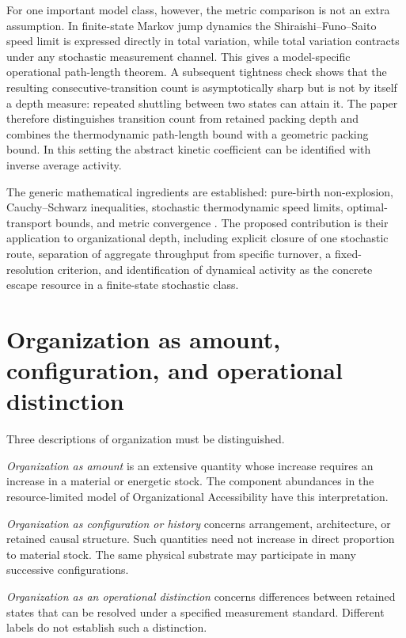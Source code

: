 \documentclass[11pt,a4paper]{article}
\theoremstyle{definition}
\numberwithin{equation}{section}
\begin{document}
For one important model class, however, the metric comparison is not an
extra assumption. In finite-state Markov jump dynamics the
Shiraishi--Funo--Saito speed limit is expressed directly in total
variation, while total variation contracts under any stochastic
measurement channel. This gives a model-specific operational path-length
theorem. A subsequent tightness check shows that the resulting
consecutive-transition count is asymptotically sharp but is not by itself a
depth measure: repeated shuttling between two states can attain it. The paper
therefore distinguishes transition count from retained packing depth and
combines the thermodynamic path-length bound with a geometric packing bound.
In this setting the abstract kinetic coefficient can be identified with
inverse average activity.

The generic mathematical ingredients are established: pure-birth
non-explosion, Cauchy--Schwarz inequalities, stochastic thermodynamic
speed limits, optimal-transport bounds, and metric convergence
\cite{Feller1971,Shiraishi2018,Aurell2011,VuSaito2023,Nagayama2025,Zhang2001}.
The proposed contribution is their application to organizational depth,
including explicit closure of one stochastic route, separation of
aggregate throughput from specific turnover, a fixed-resolution
criterion, and identification of dynamical activity as the concrete
escape resource in a finite-state stochastic class.

\section{Organization as amount, configuration, and operational distinction}

Three descriptions of organization must be distinguished.

\emph{Organization as amount} is an extensive quantity whose increase
requires an increase in a material or energetic stock. The component
abundances in the resource-limited model of Organizational Accessibility
have this interpretation.

\emph{Organization as configuration or history} concerns arrangement,
architecture, or retained causal structure. Such quantities need not
increase in direct proportion to material stock. The same physical
substrate may participate in many successive configurations.

\emph{Organization as an operational distinction} concerns differences
between retained states that can be resolved under a specified
measurement standard. Different labels do not establish such a
distinction.
\end{document}

